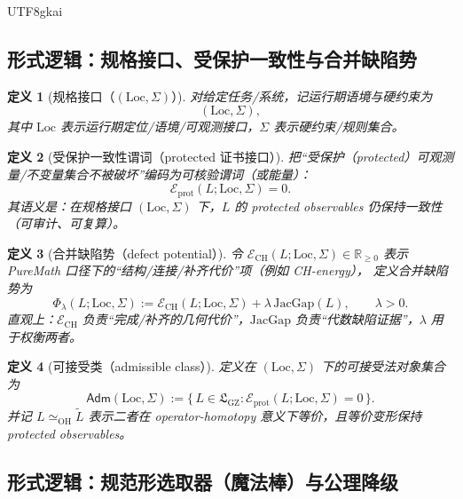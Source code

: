 \documentclass[12pt]{article}
\newtheorem{definition}{定义}[section]
\newcommand{\RR}{\mathbb{R}}
\newcommand{\GZLS}{\ensuremath{\mathfrak{L}_{\mathrm{GZ}}}}
\newcommand{\JacGap}{\ensuremath{\mathrm{JacGap}}} %
\begin{document}
\begin{CJK*}{UTF8}{gkai}
\subsection{形式逻辑：规格接口、受保护一致性与合并缺陷势}
\label{sec:magic-wand-puremath-spec-potential}

\begin{definition}[规格接口（\texorpdfstring{$(\mathrm{Loc},\Sigma)$}{(Loc,Sigma)}）]
\label{def:magic-wand-puremath-spec}
对给定任务/系统，记运行期语境与硬约束为
\[
  (\mathrm{Loc},\Sigma),
\]
其中 $\mathrm{Loc}$ 表示运行期定位/语境/可观测接口，$\Sigma$ 表示硬约束/规则集合。
\end{definition}

\begin{definition}[受保护一致性谓词（protected 证书接口）]
\label{def:magic-wand-puremath-protected}
把“受保护（protected）可观测量/不变量集合不被破坏”编码为可核验谓词（或能量）：
\[
  \mathcal{E}_{\mathrm{prot}}(L;\mathrm{Loc},\Sigma)=0.
\]
其语义是：在规格接口 $(\mathrm{Loc},\Sigma)$ 下，$L$ 的 protected observables 仍保持一致性（可审计、可复算）。
\end{definition}

\begin{definition}[合并缺陷势（defect potential）]
\label{def:magic-wand-puremath-potential}
令 $\mathcal{E}_{\mathrm{CH}}(L;\mathrm{Loc},\Sigma)\in\RR_{\ge 0}$ 表示 PureMath 口径下的“结构/连接/补齐代价”项（例如 CH-energy），
定义合并缺陷势为
\[
  \Phi_\lambda(L;\mathrm{Loc},\Sigma)
  :=
  \mathcal{E}_{\mathrm{CH}}(L;\mathrm{Loc},\Sigma)
  + \lambda\,\JacGap(L),
  \qquad \lambda>0.
\]
直观上：$\mathcal{E}_{\mathrm{CH}}$ 负责“完成/补齐的几何代价”，$\JacGap$ 负责“代数缺陷证据”，$\lambda$ 用于权衡两者。
\end{definition}

\begin{definition}[可接受类（admissible class）]
\label{def:magic-wand-puremath-admissible}
定义在 $(\mathrm{Loc},\Sigma)$ 下的可接受法对象集合为
\[
  \mathsf{Adm}(\mathrm{Loc},\Sigma)
  :=
  \{\,L\in\GZLS:\mathcal{E}_{\mathrm{prot}}(L;\mathrm{Loc},\Sigma)=0\,\}.
\]
并记 $L\simeq_{\mathrm{OH}}\widetilde L$ 表示二者在 operator-homotopy 意义下等价，且等价变形保持 protected observables。
\end{definition}

\subsection{形式逻辑：规范形选取器（魔法棒）与公理降级}
\label{sec:magic-wand-puremath-wand}


\end{CJK*}
\end{document}
